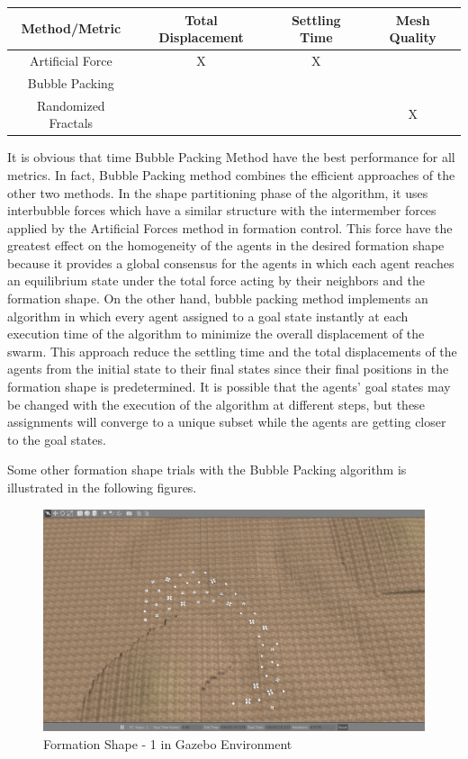 \begin{center}
 \label{tab:title} 
\begin{tabular}{||c| c| c |c ||}
				
\hline
\textbf{Method/Metric} & \textbf{Total Displacement}  & \textbf{Settling Time} & \textbf{Mesh Quality}\\ 
\hline
Artificial Force & X & X &  \\
Bubble Packing & &  &  \\	
Randomized Fractals & &  & X \\	
\hline
\end{tabular}
\end{center}
		
It is obvious that time Bubble Packing Method have the best performance for all metrics. In fact, Bubble Packing method combines the efficient approaches of the other two methods. In the shape partitioning phase of the algorithm, it uses interbubble forces which have a similar structure with the intermember forces applied by the Artificial Forces method in formation control. This force have the greatest  effect on the homogeneity of the agents in the desired formation shape because it provides a global consensus for the agents in which each agent reaches an equilibrium state under the total force acting by their neighbors and the formation shape. On the other hand, bubble packing method implements an algorithm in which every agent assigned to a goal state instantly at each execution time of the algorithm to minimize the overall displacement of the swarm. This approach reduce the settling time and the total displacements of the agents from the initial state to their final states since their final positions in the formation shape is predetermined. It is possible that the agents' goal states may be changed with the execution of the algorithm at different steps, but these assignments will converge to a unique subset while the agents are getting closer to the goal states. 
		
Some other formation shape trials with the Bubble Packing algorithm is illustrated in the following figures.

\begin{figure}[H]
\caption{Formation Shape - 1 in Gazebo Environment}
\centerline{\includegraphics[scale = 0.35]{1_Gazebo}}
\end{figure} 
			
